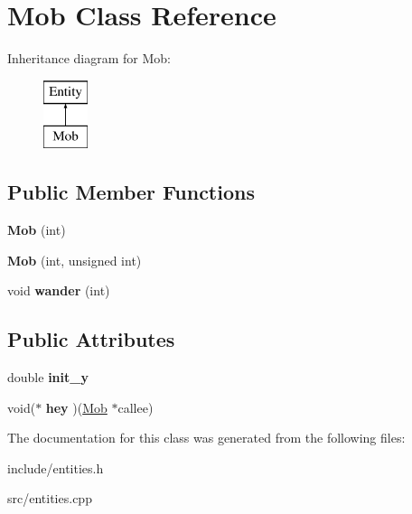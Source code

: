 \hypertarget{classMob}{}\section{Mob Class Reference}
\label{classMob}
Inheritance diagram for Mob\+:\begin{figure}[H]
\begin{center}
\leavevmode
\includegraphics[height=2.000000cm]{classMob}
\end{center}
\end{figure}
\subsection*{Public Member Functions}
\begin{DoxyCompactItemize}
\item 
\hypertarget{classMob_ad50eb95b46c938b241740a4d32722819}{}{\bfseries Mob} (int)\label{classMob_ad50eb95b46c938b241740a4d32722819}

\item 
\hypertarget{classMob_a71d17d4e5ea4fe52e26d5915657c6a5a}{}{\bfseries Mob} (int, unsigned int)\label{classMob_a71d17d4e5ea4fe52e26d5915657c6a5a}

\item 
\hypertarget{classMob_a71c65ea9cab8e4c53c46ee37e24ea843}{}void {\bfseries wander} (int)\label{classMob_a71c65ea9cab8e4c53c46ee37e24ea843}

\end{DoxyCompactItemize}
\subsection*{Public Attributes}
\begin{DoxyCompactItemize}
\item 
\hypertarget{classMob_af70bc5294f024ff06e980452f1aea3f0}{}double {\bfseries init\+\_\+y}\label{classMob_af70bc5294f024ff06e980452f1aea3f0}

\item 
\hypertarget{classMob_ae0639f1baf866a935194372473734033}{}void($\ast$ {\bfseries hey} )(\hyperlink{classMob}{Mob} $\ast$callee)\label{classMob_ae0639f1baf866a935194372473734033}

\end{DoxyCompactItemize}


The documentation for this class was generated from the following files\+:\begin{DoxyCompactItemize}
\item 
include/entities.\+h\item 
src/entities.\+cpp\end{DoxyCompactItemize}
